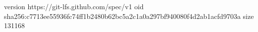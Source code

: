 version https://git-lfs.github.com/spec/v1
oid sha256:c7713ee55936fc74ff1b2480b62bc5a2c1a0a297bf940080f4d2ab1acfd9703a
size 131168
